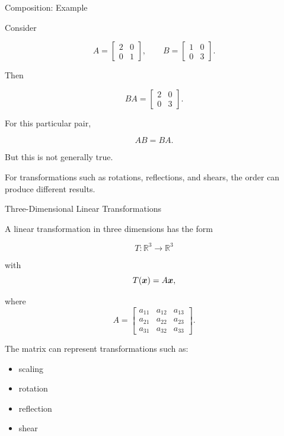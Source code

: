 \begin{frame}{Composition: Example}

Consider

\[
A=
\begin{bmatrix}
2&0\\
0&1
\end{bmatrix},
\qquad
B=
\begin{bmatrix}
1&0\\
0&3
\end{bmatrix}.
\]

Then

\[
BA
=
\begin{bmatrix}
2&0\\
0&3
\end{bmatrix}.
\]

For this particular pair,

\[
AB=BA.
\]

But this is not generally true.

For transformations such as rotations, reflections,
and shears, the order can produce different results.

\end{frame}



\begin{frame}{Three-Dimensional Linear Transformations}

A linear transformation in three dimensions has the form

\[
\boxed{
T:\mathbb{R}^3\rightarrow\mathbb{R}^3
}
\]

with
\vspace{-0.1cm}
\[
T(\bm{x})=A\bm{x},
\]

where
\vspace{-0.1cm}
\[
A=
\begin{bmatrix}
a_{11}&a_{12}&a_{13}\\
a_{21}&a_{22}&a_{23}\\
a_{31}&a_{32}&a_{33}
\end{bmatrix}.
\]

The matrix can represent transformations such as:

\begin{itemize}
    \item scaling
    \item rotation
    \item reflection
    \item shear
\end{itemize}

\end{frame}


